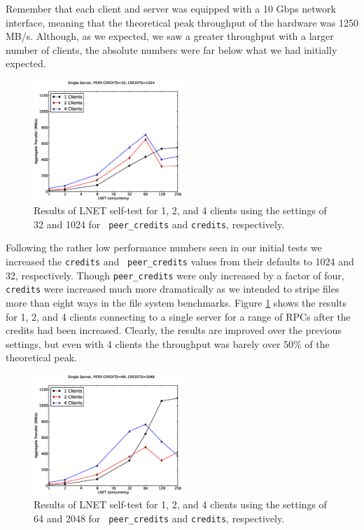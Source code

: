 \documentclass[]{sig-alternate}
\begin{document}
Remember that each client and server was equipped with a 10 Gbps network interface, meaning that the
theoretical peak throughput of the hardware was 1250 MB/s. Although, as we expected, we saw a greater
throughput with a larger number of clients, the absolute numbers were far below what we had initially
expected.

\begin{figure}
\centering
\includegraphics[width=0.50\textwidth]{figures/32pc_plot.eps}
\caption{Results of LNET self-test for 1, 2, and 4 clients using the settings of 32 and 1024 for {\tt
    peer\_credits} and {\tt credits}, respectively.}
\label{fig:32pc}
\end{figure}

Following the rather low performance numbers seen in our initial tests we increased the {\tt credits} and {\tt
  peer\_credits} values from their defaults to 1024 and 32, respectively. Though {\tt peer\_credits} were only
increased by a factor of four, {\tt credits} were increased much more dramatically as we intended to stripe
files more than eight ways in the file system benchmarks. Figure \ref{fig:32pc} shows the results for 1, 2,
and 4 clients connecting to a single server for a range of RPCs after the credits had been increased. Clearly,
the results are improved over the previous settings, but even with 4 clients the throughput was barely over
50\% of the theoretical peak.  

\begin{figure}
\centering
\includegraphics[width=0.50\textwidth]{figures/64pc_plot.eps}
\caption{Results of LNET self-test for 1, 2, and 4 clients using the settings of 64 and 2048 for {\tt
    peer\_credits} and {\tt credits}, respectively.}
\label{fig:64pc}
\end{figure}
\end{document}
